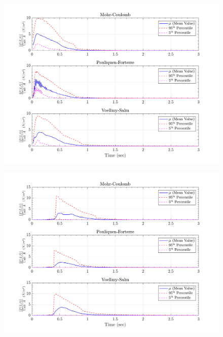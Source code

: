 \documentclass{article}
\begin{document}
\begin{figure}[H]
	\begin{minipage}[b]{0.5\linewidth}
    	\centering
    	\includegraphics[width=1\textwidth]{InclinedPlane/LocalRecords/Records/Fbc_L1.png}
    	\label{fig:Ramp-L1-Fbc}
	\end{minipage}
	\begin{minipage}[b]{0.5\linewidth}
		\centering
		\includegraphics[width=1\textwidth]{InclinedPlane/LocalRecords/Records/Fbc_L8.png}
    	\label{fig:Ramp-L2-Fbc}
    \end{minipage}


\end{figure}
\end{document}
